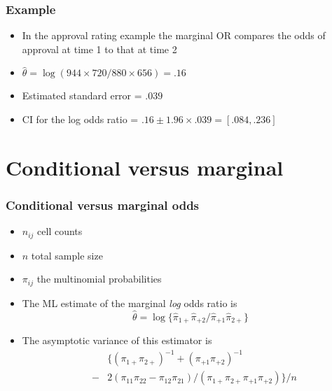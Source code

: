 \documentclass[aspectratio=169]{beamer}
\begin{document}
\begin{frame}\frametitle{Example}
\begin{itemize}
\item In the approval rating example the marginal OR compares
the odds of approval at time 1 to that at time 2
\item $\hat \theta = \log(944\times 720 / 880 \times 656) = .16$
\item Estimated standard error = $.039$
\item CI for the log odds ratio = $.16 \pm 1.96 \times .039 = [.084, .236]$
\end{itemize}
\end{frame}

\section{Conditional versus marginal}

\begin{frame}\frametitle{Conditional versus marginal odds}
\begin{itemize}
\item $n_{ij}$ cell counts 
\item $n$ total sample size
\item $\pi_{ij}$ the multinomial probabilities
\item The ML estimate of the marginal {\em log} odds ratio is
$$\hat \theta = \log\{\hat \pi_{1+} \hat \pi_{+2}/ \hat \pi_{+1} \hat \pi_{2+}\}$$
\item The asymptotic variance of this estimator is
  \begin{eqnarray*}
&   & \{ (\pi_{1+}\pi_{2+})^{-1} + (\pi_{+1}\pi_{+2})^{-1} \\
& - & 2(\pi_{11}\pi_{22} - \pi_{12}\pi_{21})/ (\pi_{1+}\pi_{2+}\pi_{+1}\pi_{+2})\}/n
  \end{eqnarray*}
\end{itemize}
\end{frame}
\end{document}
